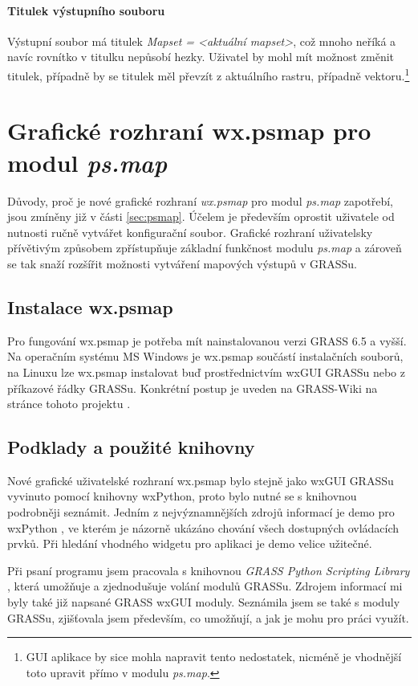 \documentclass[a4paper,12pt,draft]{article}
\newcommand{\modul}[1]{\emph{#1}}
\begin{document}
\paragraph*{Titulek výstupního souboru}
Výstupní soubor má titulek \emph{Mapset = \textless aktuální
mapset\textgreater}, což mnoho neříká a navíc rovnítko v titulku
nepůsobí hezky. Uživatel by mohl mít možnost změnit titulek,
případně by se titulek měl převzít z aktuálního rastru, případně
vektoru.\footnote{GUI aplikace by sice mohla napravit tento nedostatek,
nicméně je vhodnější toto upravit přímo v modulu \modul{ps.map}.}



\section{Grafické rozhraní  wx.psmap pro modul \modul{ps.map}}
\label{sec:gui}

Důvody, proč je nové grafické rozhraní \emph{wx.psmap} pro
modul \modul{ps.map} zapotřebí, jsou zmíněny již v části
\ref{sec:psmap}. Účelem je především oprostit uživatele od nutnosti
ručně vytvářet konfigurační soubor. Grafické rozhraní uživatelsky
přívětivým způsobem zpřístupňuje základní funkčnost modulu
\modul{ps.map} a zároveň se tak snaží rozšířit možnosti vytváření
mapových výstupů v GRASSu.

\subsection{Instalace wx.psmap}
Pro fungování wx.psmap je potřeba mít nainstalovanou verzi
GRASS 6.5 a vyšší. Na operačním systému MS Windows je wx.psmap
součástí instalačních souborů, na Linuxu lze wx.psmap instalovat buď
prostřednictvím wxGUI GRASSu nebo z příkazové řádky GRASSu. Konkrétní
postup je uveden na GRASS-Wiki na stránce tohoto projektu \cite{wiki_wxpsmap}.

\subsection{Podklady a použité knihovny}
Nové grafické uživatelské rozhraní wx.psmap bylo stejně jako wxGUI
GRASSu vyvinuto pomocí knihovny wxPython,
proto bylo nutné se s knihovnou podrobněji seznámit. Jedním z
nejvýznamnějších zdrojů informací je demo pro wxPython \cite{demo},
ve kterém je názorně ukázáno chování všech dostupných ovládacích
prvků. Při
hledání vhodného widgetu pro aplikaci je demo velice užitečné.

Při psaní programu jsem pracovala s knihovnou \emph{GRASS Python
Scripting Library} \cite{script}, která umožňuje a zjednodušuje
volání modulů GRASSu. Zdrojem informací mi byly také již napsané
GRASS wxGUI moduly. Seznámila jsem se také s moduly GRASSu, zjišťovala
jsem především, co umožňují, a jak je mohu pro práci využít.
\end{document}
